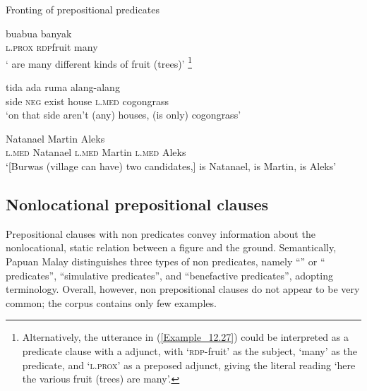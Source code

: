 \begin{styleExampleTitle}
Fronting of prepositional predicates
\end{styleExampleTitle}

\ea
\label{Example_12.27}
 {} {bua{\Tilde}bua} {banyak}\\ %
  {}  \textsc{l.prox}  \textsc{rdp}{\Tilde}fruit  many\\
\glt 
‘\bluebold{)} are many different kinds of fruit (trees)’ \textstyleExampleSource{[080922-001a-CvPh.0418]}\footnote{Alternatively, the utterance in (\ref{Example_12.27}) could be interpreted as a  predicate clause with a  adjunct, with  ‘\textsc{rdp}{}-fruit’ as the subject,  ‘many’ as the predicate, and  ‘\textsc{l.prox}’ as a preposed  adjunct, giving the literal reading ‘here the various fruit (trees) are many’.}
\z

\ea
\label{Example_12.28}
 {tida} {ada} {ruma} {} {} {alang-alang}\\ %
 side  \textsc{neg}  exist  house  {}  \textsc{l.med}  cogongrass\\
\glt 
‘on that side aren’t (any) houses, \bluebold{)} (is only) cogongrass’ \textstyleExampleSource{[081025-008-Cv.0149]}
\z

\ea
\label{Example_12.29}
\gll {\ldots} {} {} {Natanael} {} {} {Martin} {} {} {Aleks}\\ %
  {} {}  \textsc{l.med}  Natanael {}   \textsc{l.med}  Martin  {}  \textsc{l.med}  Aleks\\
 ‘[Burwas (village can have) two candidates,] \bluebold{)} is Natanael, \bluebold{)} is Martin, \bluebold{)} is Aleks’ \textstyleExampleSource{[080919-001-Cv.0117]}
\z

\subsection{Non{locational} prepositional clauses}
\label{Para_12.4.2}
Prepositional clauses with non predicates convey information about the non\-lo\-ca\-tional, static relation between a figure and the ground. Semantically, Papuan Malay distinguishes three types of non predicates, namely “” or “ predicates”, “simulative predicates”, and “benefactive predicates”, adopting  terminology. Overall, however, non prepositional clauses do not appear to be very common; the corpus contains only few examples.



